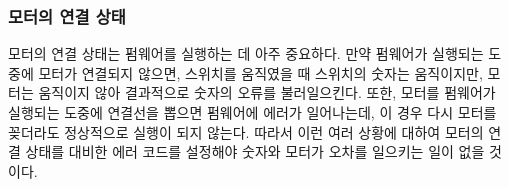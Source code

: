 \subsubsection{모터의 연결 상태}

모터의 연결 상태는 펌웨어를 실행하는 데 아주 중요하다. 만약 펌웨어가 실행되는 도중에 모터가 연결되지 않으면, 스위치를 움직였을 때 스위치의 숫자는 움직이지만, 모터는 움직이지 않아 결과적으로 숫자의 오류를 불러일으킨다. 또한, 모터를 펌웨어가 실행되는 도중에 연결선을 뽑으면 펌웨어에 에러가 일어나는데, 이 경우 다시 모터를 꽂더라도 정상적으로 실행이 되지 않는다. 따라서 이런 여러 상황에 대하여 모터의 연결 상태를 대비한 에러 코드를 설정해야 숫자와 모터가 오차를 일으키는 일이 없을 것이다.

